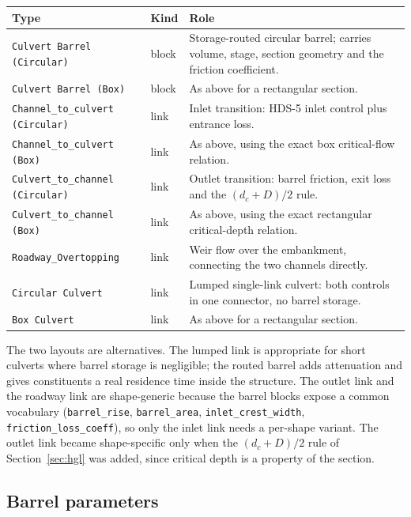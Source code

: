 \documentclass[11pt,a4paper]{article}
\newcommand{\code}[1]{\texttt{\small #1}}
\begin{document}
\begin{longtable}{@{}p{}p{}p{}@{}}
\toprule
\textbf{Type} & \textbf{Kind} & \textbf{Role}\\
\midrule
\endhead
\code{Culvert Barrel (Circular)} & block & Storage-routed circular barrel; carries volume, stage, section geometry and the friction coefficient.\\
\code{Culvert Barrel (Box)} & block & As above for a rectangular section.\\
\code{Channel\_to\_culvert (Circular)} & link & Inlet transition: HDS-5 inlet control plus entrance loss.\\
\code{Channel\_to\_culvert (Box)} & link & As above, using the exact box critical-flow relation.\\
\code{Culvert\_to\_channel (Circular)} & link & Outlet transition: barrel friction, exit loss and the $(d_c+D)/2$ rule.\\
\code{Culvert\_to\_channel (Box)} & link & As above, using the exact rectangular critical-depth relation.\\
\code{Roadway\_Overtopping} & link & Weir flow over the embankment, connecting the two channels directly.\\
\code{Circular Culvert} & link & Lumped single-link culvert: both controls in one connector, no barrel storage.\\
\code{Box Culvert} & link & As above for a rectangular section.\\
\bottomrule
\end{longtable}

\noindent
The two layouts are alternatives. The lumped link is appropriate for short
culverts where barrel storage is negligible; the routed barrel adds attenuation
and gives constituents a real residence time inside the structure. The outlet
link and the roadway link are shape-generic because the barrel blocks expose a
common vocabulary (\code{barrel\_rise}, \code{barrel\_area},
\code{inlet\_crest\_width}, \code{friction\_loss\_coeff}), so only the
inlet link needs a per-shape variant. The outlet link became shape-specific only
when the $(d_c+D)/2$ rule of Section~\ref{sec:hgl} was added, since critical
depth is a property of the section.

\subsection{Barrel parameters}
\end{document}
